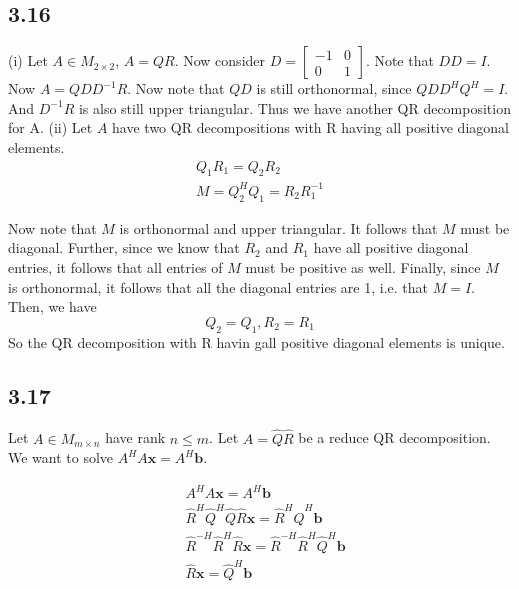 \documentclass{article}
\begin{document}
	\subsection*{3.16}
	(i) Let $A \in M_{2\times2}$, $A = QR$. Now consider $D = \begin{bmatrix} -1 & 0  \\ 0 & 1 \end{bmatrix}$. Note that $DD = I$. Now $A = QDD^{-1}R$. Now note that $QD$ is still orthonormal, since $QDD^HQ^H = I$. And $D^{-1}R$ is also still upper triangular. Thus we have another QR decomposition for A.
	\newline
	\noindent(ii) Let $A$ have two QR decompositions with R having all positive diagonal elements. 
	\begin{align*}
	Q_1 R_1 = Q_2 R_2 \\
	M= Q_2^{H} Q_1 = R_2 R_1^{-1} 
	\end{align*}
	
	Now note that $M$ is orthonormal and upper triangular. It follows that $M$ must be diagonal. Further, since we know that $R_2$ and $R_1$ have all positive diagonal entries, it follows that all entries of $M$ must be positive as well. Finally, since $M$ is orthonormal, it follows that all the diagonal entries are 1, i.e. that $M = I$. Then, we have
	\[ Q_2 = Q_1, R_2 = R_1 \]
	So the QR decomposition with R havin gall positive diagonal elements is unique.
	
	\subsection*{3.17}
	Let $A \in M_{m \times n}$ have rank $n \leq m$. Let $A = \hat{Q} \hat{R}$ be a reduce QR decomposition. We want to solve $A^H A \mathbf{x} = A^H \mathbf{b}$. 
	
	\begin{align*}
	&A^H A \mathbf{x} = A^H \mathbf{b} \\
	&\hat{R}^H \hat{Q}^H \hat{Q} \hat{R} \mathbf{x} = \hat{R}^H \hat{Q}^H \mathbf{b} \\
	&\hat{R}^{-H} \hat{R}^H \hat{R} \mathbf{x} = \hat{R}^{-H} \hat{R}^H \hat{Q}^H \mathbf{b} \\
	&\hat{R} \mathbf{x} = \hat{Q}^H \mathbf{b}
	\end{align*}
	
\end{document}

